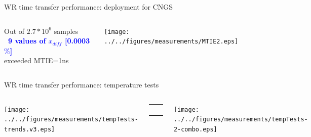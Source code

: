 \documentclass[compress,red]{beamer}
\begin{document}
\begin{frame}{WR time transfer performance: deployment for CNGS}

  \begin{columns}[c]
	  \begin{center}

	    Out of $2.7*10^6$ samples\\
			\textbf{\textcolor{blue}{~9 values of $x_{diff}$ [0.0003$\%$]}} \\
                       exceeded MTIE=1ns
		


	  \end{center}
		\begin{center}
		\texttt{[image: ../../figures/measurements/MTIE2.eps]}
		\end{center}
  \end{columns}
\end{frame}
\begin{frame}{WR time transfer performance: temperature tests}

  \begin{columns}[c]
		\hspace{-1.0cm}
		\begin{center}
		\texttt{[image: ../../figures/measurements/tempTests-trends.v3.eps]}
		\end{center}

		\begin{center}
		  \begin{table}[!t] \footnotesize 
		  \begin{tabular}{ c  c }     
		  \multicolumn{2}{c}{ }       \\         
		   \multicolumn{2}{c}{ }       \\    
		     &    \\ 
		    &     \\ 
		  \end{tabular}
		  \end{table}   		
		\end{center}

		\hspace{-0.8cm}
		\begin{center}
		\texttt{[image: ../../figures/measurements/tempTests-2-combo.eps]}
		\end{center}


  \end{columns} 
\end{frame}
\end{document}
